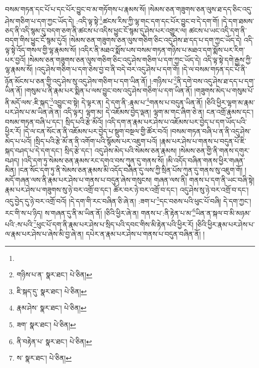 བསམ་གཏན་དང་པོ་པ་དང་པོར་བྱུང་བ་མ་གཏོགས་པ་རྣམས་སོ། །སེམས་ཅན་གཟུགས་ཅན་ལུས་ཐ་དད་ཅིང་འདུ་ཤེས་གཅིག་པ་དག་ཀྱང་ཡོད་དེ། :འདི་ལྟ་སྟེ་\footnote{}ཚངས་རིས་ཀྱི་ལྷ་གང་དག་དང་པོར་བྱུང་བ་དེ་དག་གོ། །དེ་དག་ཐམས་ཅད་ནི་འདི་སྙམ་དུ་བདག་ཅག་ནི་ཚངས་པ་འདིས་ཕྱུང་ངོ་སྙམ་དུ་ཤེས་པར་འགྱུར་ལ། ཚངས་པ་ཡང་འདི་དག་ནི་བདག་གིས་ཕྱུང་ངོ་སྙམ་དུའོ། །སེམས་ཅན་གཟུགས་ཅན་ལུས་གཅིག་ཅིང་འདུ་ཤེས་ཐ་དད་པ་དག་ཀྱང་ཡོད་དེ། འདི་ལྟ་སྟེ་འོད་གསལ་གྱི་ལྷ་རྣམས་སོ། །འདིར་ནི་མཐའ་སྨོས་པས་བསམ་གཏན་གཉིས་པ་མཐའ་དག་སྨོས་པར་རིག་པར་བྱའོ། །སེམས་ཅན་གཟུགས་ཅན་ལུས་གཅིག་ཅིང་འདུ་ཤེས་གཅིག་པ་དག་ཀྱང་ཡོད་དེ། འདི་ལྟ་སྟེ་དགེ་རྒྱས་ཀྱི་ལྷ་རྣམས་སོ། །འདུ་ཤེས་གཅིག་པ་དག་ཅེས་བྱ་བ་ནི་བདེ་བར་འདུ་ཤེས་པ་དག་གོ། །དེ་ལ་བསམ་གཏན་དང་པོ་ནི་ཉོན་མོངས་པ་ཅན་གྱི་འདུ་ཤེས་སུ་འདུ་ཤེས་གཅིག་པ་དག་ཡིན་ནོ། །:གཉིས་པ་\footnote{གཉིས་པ་ན་  སྣར་ཐང་།  པེ་ཅིན། }ནི་དགེ་བས་འདུ་ཤེས་ཐ་དད་པ་དག་ཡིན་ནོ། །གསུམ་པ་ནི་རྣམ་པར་སྨིན་པ་ལས་བྱུང་བས་འདུ་ཤེས་གཅིག་པ་དག་ཡིན་ནོ། །གཟུགས་མེད་པ་གསུམ་པོ་ནི་མདོ་ལས་:ཇི་སྐད་\footnote{ཇི་སྐད་དུ་  སྣར་ཐང་།  པེ་ཅིན། }འབྱུང་བ་སྟེ། དེ་ལྟར་ན། དེ་དག་ནི་:རྣམ་པ་\footnote{རྣམ་ཤེས་  སྣར་ཐང་།  པེ་ཅིན། }གནས་པ་བདུན་ཡིན་ནོ། །ཅིའི་ཕྱིར་ལྷག་མ་རྣམ་པར་ཤེས་པ་མ་ཡིན་ཞེ་ན། འདི་ལྟར། ལྷག་མ། དེ་འཇོམས་བྱེད་ལྡན། ལྷག་མ་གང་ཞིག་ཅེ་ན། ངན་འགྲོ་རྣམས་དང་། བསམ་གཏན་བཞི་པ་དང་། སྲིད་པའི་རྩེ་མོའོ། །འདི་དག་ན་རྣམ་པར་ཤེས་པ་འཇོམས་པར་བྱེད་པ་དག་ཡོད་པའི་ཕྱིར་རོ། །དེ་ལ་ངན་སོང་ན་ནི་འཇོམས་པར་བྱེད་པ་སྡུག་བསྔལ་གྱི་ཚོར་བའོ། །བསམ་གཏན་བཞི་པ་ན་ནི་འདུ་ཤེས་མེད་པ་པའོ། །སྲིད་པའི་རྩེ་མོ་ན་ནི་འགོག་པའི་སྙོམས་པར་འཇུག་པའོ། །རྣམ་པར་ཤེས་པ་གནས་པ་བདུན་པོ་ཇི་སྐད་བཤད་པ་དེ་དག་དང་། སྲིད་རྩེ་དང་། འདུ་ཤེས་མེད་པའི་སེམས་ཅན་རྣམས། །སེམས་ཅན་གྱི་ནི་གནས་དགུར་བཤད། །འདི་དག་ཏུ་སེམས་ཅན་རྣམས་རང་དགའ་བས་ཀུན་དུ་གནས་སོ། །མི་འདོད་བཞིན་གནས་ཕྱིར་གཞན་མིན། །ངན་སོང་དག་ཏུ་ནི་སེམས་ཅན་རྣམས་མི་འདོད་བཞིན་དུ་ལས་ཀྱི་སྲིན་པོས་ཀུན་དུ་གནས་སུ་འཇུག་གོ། །མདོ་གཞན་ལས་ནི་རྣམ་པར་ཤེས་པ་གནས་པ་བདུན་ཞེས་གསུངས། གཞན་ལས་ནི། གནས་པ་དག་ནི་ཡང་བཞི་སྟེ། རྣམ་པར་ཤེས་པ་གཟུགས་སུ་ཉེ་བར་འགྲོ་བ་དང་། ཚོར་བར་ཉེ་བར་འགྲོ་བ་དང་། འདུ་ཤེས་སུ་ཉེ་བར་འགྲོ་བ་དང་། འདུ་བྱེད་དུ་ཉེ་བར་འགྲོ་བའོ། །དེ་དག་གི་རང་བཞིན་ཅི་ཞེ་ན། :ཟག་པ་\footnote{ཟག་  སྣར་ཐང་།  པེ་ཅིན། }དང་བཅས་པའི་ཕུང་པོ་བཞི། དེ་དག་ཀྱང་། རང་གི་ས་པ་ཉིད། ས་གཞན་དུ་ནི་མ་ཡིན་ནོ། །ཅིའི་ཕྱིར་ཞེ་ན། གནས་པ་:ནི་རྟེན་པ་མ་\footnote{ནི་བརྟེན་པ་  སྣར་ཐང་།  པེ་ཅིན། }ཡིན་ན་སྐལ་བ་མི་མཉམ་པའི་:ས་པའི་\footnote{ས་  སྣར་ཐང་།  པེ་ཅིན། }ཕུང་པོ་དག་ནི་རྣམ་པར་ཤེས་པ་སྲིད་པའི་དབང་གིས་མི་རྟེན་པའི་ཕྱིར་རོ། །ཅིའི་ཕྱིར་རྣམ་པར་ཤེས་པ་ལ་རྣམ་པར་ཤེས་པ་ཞེས་མི་བྱ་ཞེ་ན། དཔེར་ན་རྣམ་པར་ཤེས་པ་གནས་པ་བདུན་བཞིན་ནོ། །

